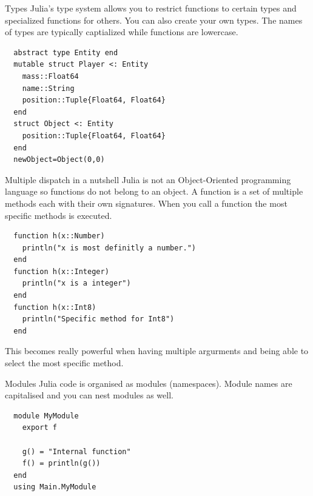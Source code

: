 \documentclass{beamer}
\begin{document}
\begin{frame}[fragile]{Types}
  Julia's type system allows you to restrict functions to certain types and specialized functions for others.
  You can also create your own types. The names of types are typically captialized while functions are lowercase.
  \begin{lstlisting}
  abstract type Entity end
  mutable struct Player <: Entity 
    mass::Float64
    name::String
    position::Tuple{Float64, Float64}
  end
  struct Object <: Entity
    position::Tuple{Float64, Float64}
  end
  newObject=Object(0,0)
  \end{lstlisting}
\end{frame}
\begin{frame}[fragile]{Multiple dispatch in a nutshell}
  Julia is not an Object-Oriented programming language so functions do not belong to an object.
  A function is a set of multiple methods each with their own signatures. When you call a function the most specific methods is executed.

  \begin{lstlisting}
  function h(x::Number)
    println("x is most definitly a number.")
  end
  function h(x::Integer)
    println("x is a integer")
  end
  function h(x::Int8)
    println("Specific method for Int8")
  end
  \end{lstlisting}
  This becomes really powerful when having multiple argurments and being able to select the most specific method.
\end{frame}
\begin{frame}[fragile]{Modules}
  Julia code is organised as modules (namespaces). Module names are capitalised and you can nest modules as well.

  \begin{lstlisting}
  module MyModule
    export f

    g() = "Internal function"
    f() = println(g())
  end
  using Main.MyModule
  \end{lstlisting}
\end{frame}
\end{document}

